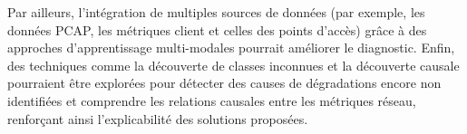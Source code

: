 Par ailleurs, l’intégration de multiples sources de données (par exemple, les données PCAP, les métriques client et celles des points d'accès) grâce à des approches d’apprentissage multi-modales pourrait améliorer le diagnostic. Enfin, des techniques comme la découverte de classes inconnues et la découverte causale pourraient être explorées pour détecter des causes de dégradations encore non identifiées et comprendre les relations causales entre les métriques réseau, renforçant ainsi l’explicabilité des solutions proposées. 
